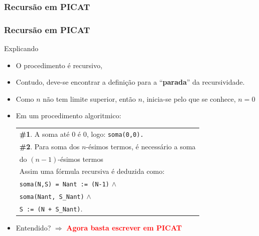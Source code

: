 \documentclass[10pt]{beamer}
\begin{document}
\begin{frame}%
 \frametitle{Recursão em PICAT}


\end{frame}


\begin{frame}%
 \frametitle{Recursão em PICAT}

\begin{block}{Explicando}
\begin{itemize}
  \item O procedimento é recursivo, 

\item Contudo, deve-se encontrar a definição para 
a ``\textbf{parada}'' da recursividade. 

\item Como $n$ não tem limite superior,
então $n$, inicia-se pelo que se conhece, $n=0$

\pause
\item Em um procedimento algoritmico:\\

{\small
\begin{center}
\begin{tabular}[c]{p{8cm}}\hline \hline
\textbf{\#1}. A soma até 0 \'{e} 0, logo: \texttt{soma(0,0).}\\
\textbf{\#2}. Para soma dos $n$-\'{e}simos termos,
 \'{e} necess\'{a}rio a soma \\
do $(n-1)$-\'{e}simos termos\\
Assim uma fórmula recursiva é deduzida como:\\
\texttt{soma(N,S) = Nant := (N-1)} $\wedge$\\ 
\texttt{soma(Nant, S\_Nant)}   $\wedge$ \\
 \texttt{S := (N + S\_Nant)}.\\ 
 \hline \hline
\end{tabular}
\end{center}
}
\pause
\item Entendido?
\pause
$\Rightarrow $ \textbf{\textcolor{red}{Agora basta escrever em PICAT}}

\end{itemize}


\end{block}

\end{frame}
\end{document}
